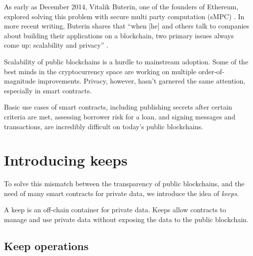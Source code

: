 \documentclass[11pt]{article}
\begin{document}
As early as December 2014, Vitalik Buterin, one of the founders of
Ethereum, explored solving this problem with secure multi party
computation (sMPC) \cite{secretSharingDaos}. In more recent writing,
Buterin shares that ``when [he] and others talk to companies about
building their applications on a blockchain, two primary issues always
come up: scalability and privacy'' \cite{privacyOnTheBlockchain}.

Scalability of public blockchains is a hurdle to mainstream adoption.
Some of the best minds in the cryptocurrency space \cite{lightning}
\cite{ethereumSharding} \cite{plasma} are working on multiple
order-of-magnitude improvements. Privacy, however, hasn't garnered the
same attention, especially in smart contracts.

Basic use cases of smart contracts, including publishing secrets after
certain criteria are met, assessing borrower risk for a loan, and
signing messages and transactions, are incredibly difficult on today's
public blockchains.

\section{Introducing keeps}

To solve this mismatch between the transparency of public blockchains,
and the need of many smart contracts for private data, we introduce
the idea of {\em keeps}.

A keep is an off-chain container for private data. Keeps allow
contracts to manage and use private data without exposing the data to
the public blockchain.

\subsection{Keep operations}
\end{document}
